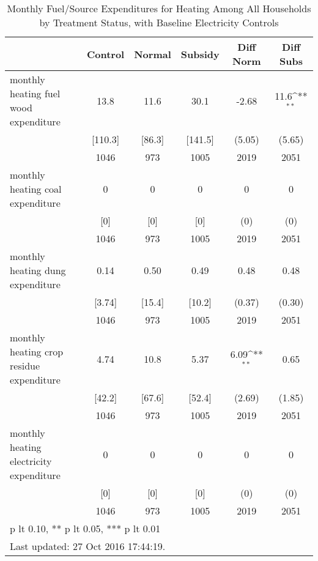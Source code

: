 \begin{table}[htbp]\centering
\def\sym#1{\ifmmode^{#1}\else\(^{#1}\)\fi}
\caption{Monthly Fuel/Source Expenditures for Heating Among All Households by Treatment Status, with Baseline Electricity Controls \label{tab:"balance"}}
\begin{tabular*}{0.9\hsize}{@{\hskip\tabcolsep\extracolsep\fill}l*{1}{ccccc}}
\toprule
                                &  Control&   Normal&  Subsidy&Diff Norm         &Diff Subs         \\
\midrule
monthly heating fuel wood expenditure&     13.8&     11.6&     30.1&    -2.68         &     11.6\sym{**} \\
                                &  [110.3]&   [86.3]&  [141.5]&   (5.05)         &   (5.65)         \\
                                &     1046&      973&     1005&     2019         &     2051         \\
monthly heating coal expenditure&        0&        0&        0&        0         &        0         \\
                                &      [0]&      [0]&      [0]&      (0)         &      (0)         \\
                                &     1046&      973&     1005&     2019         &     2051         \\
monthly heating dung expenditure&     0.14&     0.50&     0.49&     0.48         &     0.48         \\
                                &   [3.74]&   [15.4]&   [10.2]&   (0.37)         &   (0.30)         \\
                                &     1046&      973&     1005&     2019         &     2051         \\
monthly heating crop residue expenditure&     4.74&     10.8&     5.37&     6.09\sym{**} &     0.65         \\
                                &   [42.2]&   [67.6]&   [52.4]&   (2.69)         &   (1.85)         \\
                                &     1046&      973&     1005&     2019         &     2051         \\
monthly heating electricity expenditure&        0&        0&        0&        0         &        0         \\
                                &      [0]&      [0]&      [0]&      (0)         &      (0)         \\
                                &     1046&      973&     1005&     2019         &     2051         \\
\bottomrule
\multicolumn{6}{l}{\footnotesize * p lt 0.10, ** p lt 0.05, *** p lt 0.01}\\
\multicolumn{6}{l}{\footnotesize Last updated: 27 Oct 2016 17:44:19.}\\
\end{tabular*}
\end{table}
